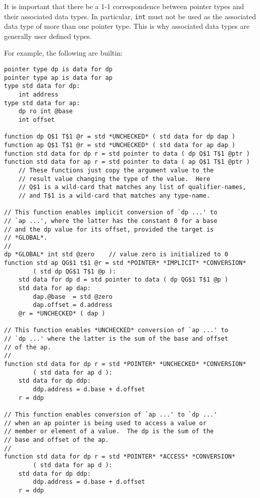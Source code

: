 \documentclass[12pt]{article}
\newenvironment{indpar}[1][0.3in]%
	{\begin{list}{}%
		     {\setlength{\itemsep}{0in}%
		      \setlength{\topsep}{0in}%
		      \setlength{\parsep}{1ex}%
		      \setlength{\labelwidth}{#1}%
		      \setlength{\leftmargin}{#1}%
		      \addtolength{\leftmargin}{\labelsep}}%
	 \item}%
	{\end{list}}
\begin{document}
It is important that there be a 1-1 correspondence between
pointer types and their associated data types.  In particular,
{\tt int} must not be used as the associated data type of
more than one pointer type.  This is why associated data types
are generally user defined types.

For example, the following are builtin:

\begin{indpar}\begin{verbatim}
pointer type dp is data for dp
pointer type ap is data for ap
type std data for dp:
    int address
type std data for ap:
    dp ro int @base
    int offset

function dp Q$1 T$1 @r = std *UNCHECKED* ( std data for dp dap )
function ap Q$1 T$1 @r = std *UNCHECKED* ( std data for ap dap )
function std data for dp r = std pointer to data ( dp Q$1 T$1 @ptr )
function std data for ap r = std pointer to data ( ap Q$1 T$1 @ptr )
    // These functions just copy the argument value to the
    // result value changing the type of the value.  Here
    // Q$1 is a wild-card that matches any list of qualifier-names,
    // and T$1 is a wild-card that matches any type-name.

// This function enables implicit conversion of `dp ...' to
// `ap ...', where the latter has the constant 0 for a base
// and the dp value for its offset, provided the target is
// *GLOBAL*.
// 
dp *GLOBAL* int std @zero    // value zero is initialized to 0
function std ap QG$1 t$1 @r = std *POINTER* *IMPLICIT* *CONVERSION*
        ( std dp QG$1 T$1 @p ):
    std data for dp d = std pointer to data ( dp QG$1 T$1 @p )
    std data for ap dap:
        dap.@base  = std @zero
        dap.offset = d.address
    @r = *UNCHECKED* ( dap )

// This function enables *UNCHECKED* conversion of `ap ...' to
// `dp ...' where the latter is the sum of the base and offset
// of the ap.
//
function std data for dp r = std *POINTER* *UNCHECKED* *CONVERSION*
        ( std data for ap d ):
    std data for dp ddp:
        ddp.address = d.base + d.offset
    r = ddp

// This function enables conversion of `ap ...' to `dp ...'
// when an ap pointer is being used to access a value or
// member or element of a value.  The dp is the sum of the
// base and offset of the ap.
//
function std data for dp r = std *POINTER* *ACCESS* *CONVERSION*
        ( std data for ap d ):
    std data for dp ddp:
        ddp.address = d.base + d.offset
    r = ddp
\end{verbatim}\end{indpar}
\end{document}
